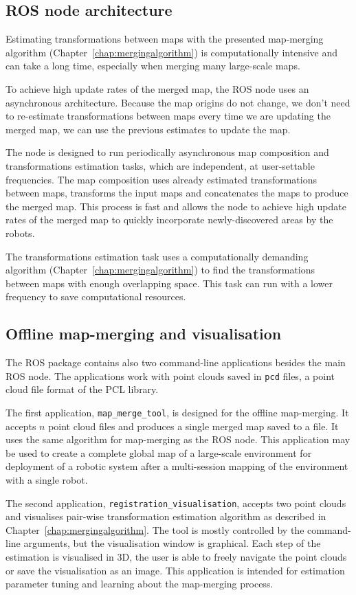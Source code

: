 \subsection{ROS node architecture}
\label{sec:node-architecture}

Estimating transformations between maps with the presented map-merging algorithm (Chapter~\ref{chap:mergingalgorithm}) is computationally intensive and can take a long time, especially when merging many large-scale maps.

To achieve high update rates of the merged map, the \gls{ROS} node uses an asynchronous architecture. Because the map origins do not change, we don't need to re-estimate transformations between maps every time we are updating the merged map, we can use the previous estimates to update the map.

The node is designed to run periodically asynchronous map composition and transformations estimation tasks, which are independent, at user-settable frequencies. The map composition uses already estimated transformations between maps, transforms the input maps and concatenates the maps to produce the merged map. This process is fast and allows the node to achieve high update rates of the merged map to quickly incorporate newly-discovered areas by the robots.

The transformations estimation task uses a computationally demanding algorithm (Chapter~\ref{chap:mergingalgorithm}) to find the transformations between maps with enough overlapping space. This task can run with a lower frequency to save computational resources.

\subsection{Offline map-merging and visualisation}
\label{sec:commandline-tools}

The \gls{ROS} package contains also two command-line applications besides the main \gls{ROS} node. The applications work with point clouds saved in \texttt{pcd} files, a point cloud file format of the \gls{PCL} library.

The first application, \texttt{map\_merge\_tool}, is designed for the offline map-merging. It accepts $n$ point cloud files and produces a single merged map saved to a file. It uses the same algorithm for map-merging as the \gls{ROS} node. This application may be used to create a complete global map of a large-scale environment for deployment of a robotic system after a multi-session mapping of the environment with a single robot.

The second application, \texttt{registration\_visualisation}, accepts two point clouds and visualises pair-wise transformation estimation algorithm as described in Chapter~\ref{chap:mergingalgorithm}. The tool is mostly controlled by the command-line arguments, but the visualisation window is graphical. Each step of the estimation is visualised in \gls{3D}, the user is able to freely navigate the point clouds or save the visualisation as an image. This application is intended for estimation parameter tuning and learning about the map-merging process.

